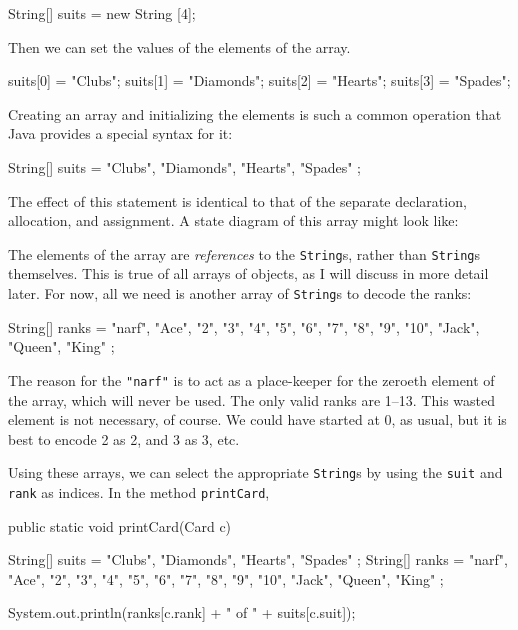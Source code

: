 \documentclass{book}
\begin{document}
\begin{verbatimtab}
    String[] suits = new String [4];
\end{verbatimtab}
%
Then we can set the values of the elements of the array.

\begin{verbatimtab}
    suits[0] = "Clubs";
    suits[1] = "Diamonds";
    suits[2] = "Hearts";
    suits[3] = "Spades";
\end{verbatimtab}
%
Creating an array and initializing the elements is such a common
operation that Java provides a special syntax for it:

\begin{verbatimtab}
    String[] suits = { "Clubs", "Diamonds", "Hearts", "Spades" };
\end{verbatimtab}
%
The effect of this statement is identical to that of the
separate declaration, allocation, and assignment.  A state
diagram of this array might look like:



The elements of the array are {\em references} to the {\tt String}s,
rather than {\tt String}s themselves.  This is true of all arrays of
objects, as I will discuss in more detail later.  For now, all we need
is another array of {\tt String}s to decode the ranks:

\begin{verbatimtab}
    String[] ranks = { "narf", "Ace", "2", "3", "4", "5", "6",
               "7", "8", "9", "10", "Jack", "Queen", "King" };
\end{verbatimtab}
%
The reason for the {\tt "narf"} is to act as a place-keeper
for the zeroeth element of the array, which will never be
used.  The only valid ranks are 1--13.  This wasted element is not
necessary, of course.  We could have started at 0, as usual, but
it is best to encode 2 as 2, and 3 as 3, etc.

Using these arrays, we can select the appropriate {\tt String}s by
using the {\tt suit} and {\tt rank} as indices.  In the method
{\tt printCard},

\begin{verbatimtab}
public static void printCard(Card c) {
    String[] suits = { "Clubs", "Diamonds", "Hearts", "Spades" };
    String[] ranks = { "narf", "Ace", "2", "3", "4", "5", "6",
                 "7", "8", "9", "10", "Jack", "Queen", "King" };

    System.out.println(ranks[c.rank] + " of " + suits[c.suit]);
}
\end{verbatimtab}
\end{document}
